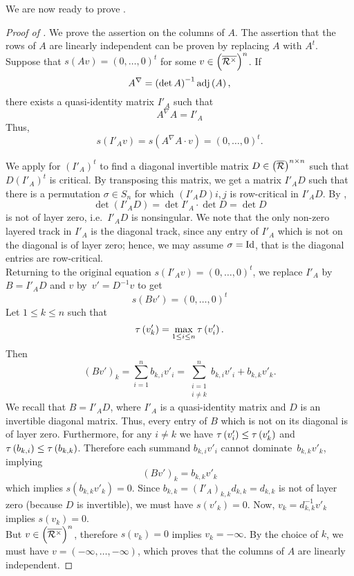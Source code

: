 We are now ready to prove .

\begin{proof}[Proof of ]
We prove the assertion on the columns of $A$. The assertion that the rows of $A$ are linearly independent can be proven by replacing $A$ with $A^t$.\\

Suppose that $s\left(Av\right)=\left(0,\dots,0\right)^t$ for some $v\in\left(\overline{\mathcal{R}^{\times}}\right)^n$. If
$$A^{\nabla}=\left(\det A\right)^{-1}\textnormal{adj}\left(A\right),$$
there exists a quasi-identity matrix $I'_A$ such that
$$A^{\nabla}A=I'_A$$
Thus,
$$s\left(I'_Av\right)=s\left(A^{\nabla}A\cdot v\right)=\left(0,\dots,0\right)^t.$$

We apply  for $\left(I'_A\right)^t$ to find a diagonal invertible matrix $D\in\left(\overline{\mathcal{R}}\right)^{n\times n}$ such that $D\left(I'_A\right)^t$ is critical. By transposing this matrix, we get a matrix $I'_AD$ such that there is a permutation $\sigma\in S_n$ for which $\left(I'_AD\right){i,j}$ is row-critical in $I'_AD$. By ,
$$\det\left(I'_AD\right)=\det I'_A\cdot\det D=\det D$$
is not of layer zero, i.e.\ $I'_AD$ is nonsingular. We note that the only non-zero layered track in $I'_A$ is the diagonal track, since any entry of $I'_A$ which is not on the diagonal is of layer zero; hence, we may assume $\sigma=\textnormal{Id}$, that is the diagonal entries are row-critical.\\

Returning to the original equation $s\left(I'_Av\right)=\left(0,\dots,0\right)^t$, we replace $I'_A$ by $B=I'_AD$ and $v$ by~$v'=D^{-1}v$ to get
$$s\left(Bv'\right)=\left(0,\dots,0\right)^t$$
Let $1\leq k\leq n$ such that
$$\tau\left(v'_k\right)=\max_{1\leq i\leq n}\tau\left(v'_i\right).$$
Then
$$\left(Bv'\right)_k=\sum_{i=1}^n b_{k,i}v'_i=\sum_{\substack{i=1\\i\neq k}}^n b_{k,i}v'_i+b_{k,k}v'_k.$$
We recall that $B=I'_AD$, where $I'_A$ is a quasi-identity matrix and $D$ is an invertible diagonal matrix. Thus, every entry of $B$ which is not on its diagonal is of layer zero. Furthermore, for any $i\neq k$ we have $\tau\left(v'_i\right)\leq\tau\left(v'_k\right)$ and $\tau\left(b_{k,i}\right)\leq\tau\left(b_{k,k}\right)$. Therefore each summand $b_{k,i}v'_i$ cannot dominate~$b_{k,k}v'_k$, implying
$$\left(Bv'\right)_k=b_{k,k}v'_k$$
which implies $s\left(b_{k,k}v'_k\right)=0$. Since $b_{k,k}=\left(I'_A\right)_{k,k}d_{k,k}=d_{k,k}$ is not of layer zero (because $D$ is invertible), we must have $s\left(v'_k\right)=0$. Now, $v_k=d_{k,k}^{-1}v'_k$ implies $s\left(v_k\right)=0$.\\

But $v\in\left(\overline{\mathcal{R}^{\times}}\right)^n$, therefore $s\left(v_k\right)=0$ implies $v_k=-\infty$. By the choice of $k$, we must have $v=\left(-\infty,\dots,-\infty\right)$, which proves that the columns of $A$ are linearly independent.
\end{proof}


